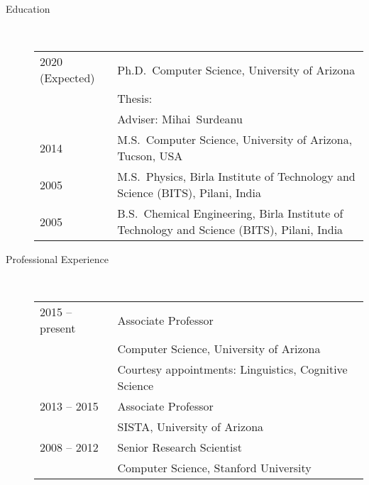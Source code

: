 \documentclass[10pt]{article}
\begin{document}
\begin{description}

\item [Education]\

\begin{tabular}{lp{4.5in}}
\hspace{-.2cm}2020 (Expected) &  Ph.D.~Computer Science, {\sc University of Arizona}
\\\vspace{.0cm}&Thesis: 
\\\vspace{.1cm}& Adviser: Mihai~Surdeanu\\
\vspace{.1cm}\hspace{-.2cm}2014 &  M.S.~Computer Science, {\sc University of Arizona, Tucson, USA} \\
\vspace{.1cm}\hspace{-.2cm}2005 &  M.S.~Physics, {\sc Birla Institute of Technology and Science (BITS), Pilani, India} \\
\hspace{-.2cm}2005 & B.S.~Chemical Engineering,  {\sc Birla Institute of Technology and Science (BITS), Pilani, India}
\end{tabular}


\item [Professional Experience]\

\begin{tabular}{lp{4.9in}}
\hspace{-.2cm}2015 -- present & Associate Professor\\\vspace{.1cm}
& Computer Science, {\sc University of Arizona}\\\vspace{.1cm}
& Courtesy appointments: Linguistics, Cognitive Science\\

\hspace{-.2cm}2013 -- 2015 & Associate Professor\\\vspace{.1cm}
& SISTA, {\sc University of Arizona} \\

\hspace{-.2cm}2008 -- 2012 & Senior Research Scientist\\\vspace{.1cm}
& Computer Science, {\sc Stanford University} \\


\end{tabular}
\end{description}
\end{document}

